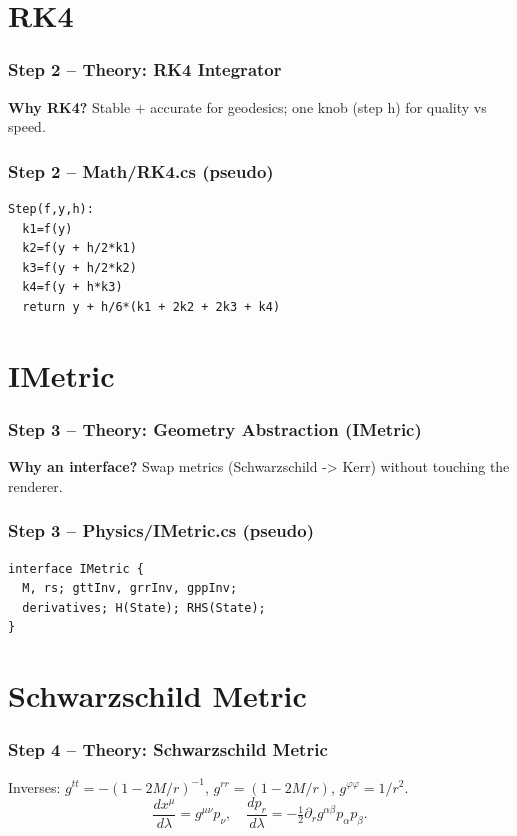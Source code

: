 \documentclass[aspectratio=169]{beamer}
\newcommand{\ProgressStep}[1]{\progressstep{#1}}
\newcommand{\ThisFrameTitle}[1]{\frametitle{#1}}
\begin{document}
\section{RK4}
\begin{frame}
  \ProgressStep{2}\ThisFrameTitle{Step 2 -- Theory: RK4 Integrator}
  \textbf{Why RK4?} Stable + accurate for geodesics; one knob (step h) for quality vs speed.
\end{frame}

\begin{frame}[fragile]
  \ProgressStep{2}\ThisFrameTitle{Step 2 -- Math/RK4.cs (pseudo)}
\begin{verbatim}
Step(f,y,h):
  k1=f(y)
  k2=f(y + h/2*k1)
  k3=f(y + h/2*k2)
  k4=f(y + h*k3)
  return y + h/6*(k1 + 2k2 + 2k3 + k4)
\end{verbatim}
\end{frame}

\section{IMetric}
\begin{frame}
  \ProgressStep{3}\ThisFrameTitle{Step 3 -- Theory: Geometry Abstraction (IMetric)}
  \textbf{Why an interface?} Swap metrics (Schwarzschild -> Kerr) without touching the renderer.
\end{frame}

\begin{frame}[fragile]
  \ProgressStep{3}\ThisFrameTitle{Step 3 -- Physics/IMetric.cs (pseudo)}
\begin{verbatim}
interface IMetric {
  M, rs; gttInv, grrInv, gppInv;
  derivatives; H(State); RHS(State);
}
\end{verbatim}
\end{frame}

\section{Schwarzschild Metric}
\begin{frame}
  \ProgressStep{4}\ThisFrameTitle{Step 4 -- Theory: Schwarzschild Metric}
  Inverses: $g^{tt}=-(1-2M/r)^{-1}$, $g^{rr}=(1-2M/r)$, $g^{\varphi\varphi}=1/r^2$.
  \[
    \frac{dx^\mu}{d\lambda}=g^{\mu\nu}p_\nu,\quad
    \frac{dp_r}{d\lambda}=-\tfrac12\partial_r g^{\alpha\beta}p_\alpha p_\beta.
  \]
\end{frame}
\end{document}
